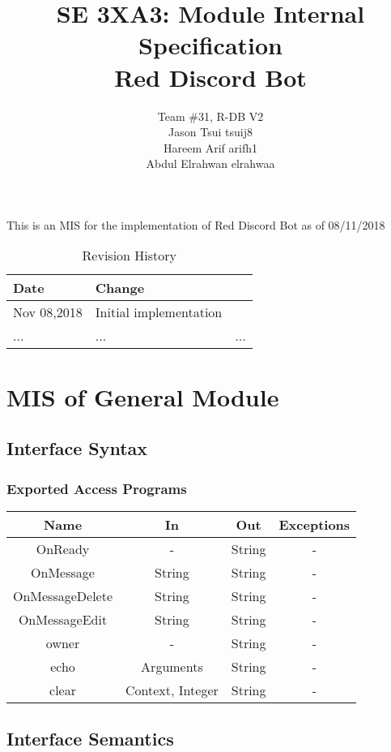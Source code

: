 \documentclass[12,english]{article}
\title{SE 3XA3: Module Internal Specification\\Red Discord Bot}
\author{Team \#31, R-DB V2
		\\ Jason Tsui tsuij8
		\\ Hareem Arif arifh1
		\\ Abdul Elrahwan elrahwaa
}
\begin{document}
\maketitle
This is an MIS for the implementation of Red Discord Bot as of 08/11/2018

\begin{table}[hp]
\caption{Revision History} \label{TblRevisionHistory}
\begin{tabularx}{\textwidth}{llX}
\toprule
\textbf{Date}  & \textbf{Change}\\
\midrule
Nov 08,2018 & Initial implementation\\
... & ... & ...\\
\bottomrule
\end{tabularx}
\end{table}


\date{}


\newpage
\tableofcontents
\newpage

        
\section{MIS of General Module}
		\subsection{Interface Syntax}
		\subsubsection{Exported Access Programs}
		\begin{tabular}[pos]{|c|c|c|c|}
			
			\hline
			\textbf{Name}& \textbf{In} & \textbf{Out} & \textbf{Exceptions} \\ \hline
			OnReady & - & String & -\\ \hline
			OnMessage & String & String & -\\ \hline
			OnMessageDelete & String & String & -\\ \hline
			OnMessageEdit & String & String & -\\ \hline
			owner & - & String & -\\ \hline
			echo & Arguments & String & -\\ \hline
			clear & Context, Integer & String & -\\ 
			 \hline
			
		\end{tabular}
		
		\subsection{Interface Semantics}
\end{document}
